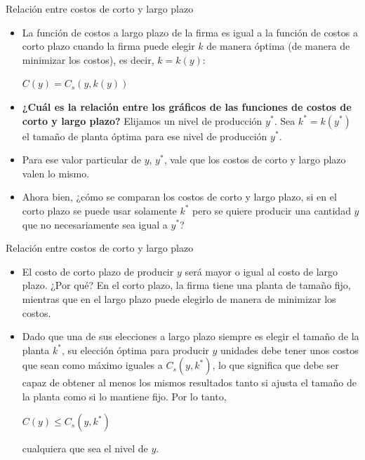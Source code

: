 \documentclass{beamer}
\theoremstyle{definition}
\begin{document}
\begin{frame}{Relaci\'on entre costos de corto y largo plazo}
\begin{itemize}
\item La función de costos a largo plazo de la firma es igual a la función de costos a corto plazo cuando la firma puede elegir $k$  de manera óptima (de manera de minimizar los costos), es decir, $k=k(y)$:
\begin{center}
$C(y)=C_s(y, k(y))$
\end{center}
\item \textbf{¿Cuál es la relación entre los gráficos de las funciones de costos de corto y largo plazo?} Elijamos un nivel de producción $y^*$. Sea $k^* = k(y^*)$ el tamaño de planta óptima para ese nivel de producción $y^*$. 

\item Para ese valor particular de $y$, $y^*$, vale que los costos de corto y largo plazo valen lo mismo. 

\item Ahora bien, ¿cómo se comparan los costos de corto y largo plazo, si en el corto plazo se puede usar solamente $k^*$ pero se quiere producir una cantidad $y$ que no necesariamente sea igual a $y^*$?

\end{itemize}
\end{frame}
\begin{frame}{Relaci\'on entre costos de corto y largo plazo}
\begin{itemize}
\item El costo de corto plazo de producir $y$ será mayor o igual al costo de largo plazo. ¿Por qué? En el corto plazo, la firma tiene una planta de tamaño fijo, mientras que en el largo plazo puede elegirlo de manera de minimizar los costos. 
\item Dado que una de sus elecciones a largo plazo siempre es elegir el tamaño de la planta $k^*$, su elección óptima para producir $y$ unidades debe tener unos
costos que sean como máximo iguales a $C_s(y, k^*)$, lo que significa que debe ser capaz
de obtener al menos los mismos resultados tanto si ajusta el tamaño de la planta como
si lo mantiene fijo. Por lo tanto,
\begin{center}
$C(y)\leq C_s(y,k^*)$
\end{center}
cualquiera que sea el nivel de $y$.
\end{itemize}
\end{frame}
\end{document}
